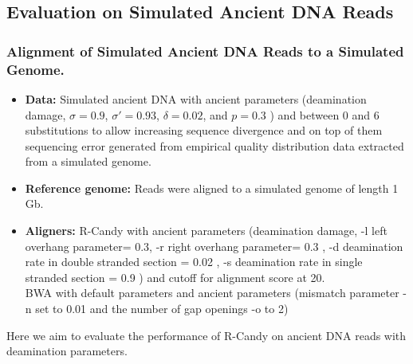\documentclass[11pt,a4paper]{report}
\begin{document}
\subsection{Evaluation on Simulated Ancient DNA Reads}

\subsubsection{Alignment of Simulated Ancient DNA Reads to a Simulated Genome.}
\label{ Alignment of Simulated Ancient DNA Reads to a Simulated Genome.}

\begin{itemize}
 
   
    \item \textbf{Data:} Simulated ancient DNA 
     with ancient parameters (deamination damage, $ \sigma = 0.9$, 
    $ \sigma' = 0.93 $, $\delta = 0.02 $,  and $p = 0.3 $ \cite{mapdamage2})
    and between 0 and 6 substitutions to allow increasing sequence divergence
    and on top of them sequencing error generated from empirical quality 
    distribution data extracted from a simulated genome.
  
 
   \item \textbf{Reference genome:}  Reads were aligned to a simulated genome of 
   length 1 Gb.


  \item \textbf{Aligners:} R-Candy with ancient parameters 
  (deamination damage, -l left overhang parameter= 0.3,
   -r right overhang parameter= 0.3 , 
   -d deamination rate in double stranded section = 0.02 , 
   -s deamination rate in single stranded section = 0.9 )
   and cutoff for alignment score at 20. \\
   BWA with default parameters and ancient parameters \cite{green2010draft}
   (mismatch parameter -n set to 0.01 and the number of gap openings -o
   to 2)

  \end{itemize}


Here we aim to evaluate the performance of R-Candy on ancient DNA reads with 
deamination parameters.
\end{document}
